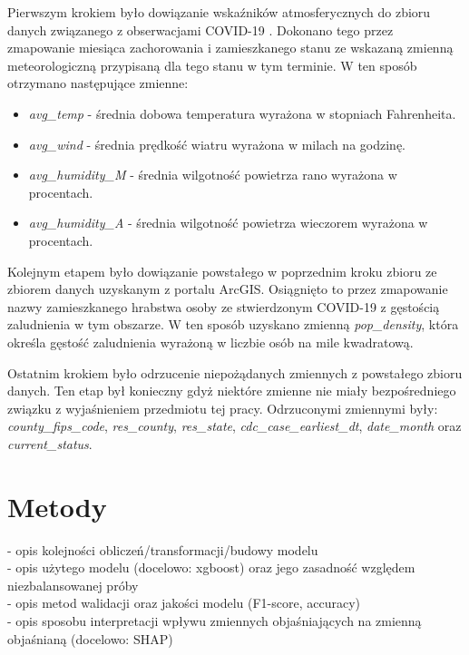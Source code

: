 \documentclass[polish, twoside, 12pt, a4paper]{article}
\theoremstyle{definition}
\theoremstyle{plain}
\theoremstyle{remark}
\begin{document}
Pierwszym krokiem było dowiązanie wskaźników atmosferycznych do zbioru danych związanego z obserwacjami COVID-19 . Dokonano tego przez zmapowanie miesiąca zachorowania i zamieszkanego stanu ze wskazaną zmienną meteorologiczną przypisaną dla tego stanu w tym terminie. W ten sposób otrzymano następujące zmienne:
\begin{itemize}
  \item \emph{avg\_temp} - średnia dobowa temperatura wyrażona w stopniach Fahrenheita.
  \item \emph{avg\_wind} - średnia prędkość wiatru wyrażona w milach na godzinę.
  \item \emph{avg\_humidity\_M} - średnia wilgotność powietrza rano wyrażona w procentach.
  \item \emph{avg\_humidity\_A} - średnia wilgotność powietrza wieczorem wyrażona w procentach.
\end{itemize}

Kolejnym etapem było dowiązanie powstałego w poprzednim kroku zbioru ze zbiorem danych uzyskanym z portalu ArcGIS. Osiągnięto to przez zmapowanie nazwy zamieszkanego hrabstwa osoby ze stwierdzonym COVID-19 z gęstością zaludnienia w tym obszarze. W ten sposób uzyskano zmienną \emph{pop\_density}, która określa gęstość zaludnienia wyrażoną w liczbie osób na mile kwadratową.

Ostatnim krokiem było odrzucenie niepożądanych zmiennych z powstałego zbioru danych. Ten etap był konieczny gdyż niektóre zmienne nie miały bezpośredniego związku z wyjaśnieniem przedmiotu tej pracy. Odrzuconymi zmiennymi były:  \emph{county\_fips\_code},  \emph{res\_county}, \emph{res\_state}, \emph{cdc\_case\_earliest\_dt}, \emph{date\_month} oraz \emph{current\_status}.

\clearpage
\section{Metody}

- opis kolejności obliczeń/transformacji/budowy modelu \\
- opis użytego modelu (docelowo: xgboost) oraz jego zasadność względem niezbalansowanej próby\\
- opis metod walidacji oraz jakości modelu (F1-score, accuracy) \\
- opis sposobu interpretacji wpływu zmiennych objaśniających na zmienną objaśnianą (docelowo: SHAP)

\clearpage
\end{document}
